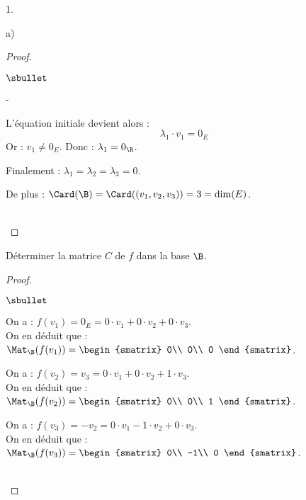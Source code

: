 \documentclass[11pt]{article}%
\begin{document}
\begin{noliste}{1.}
\begin{noliste}{a)}
\begin{proof}
\begin{noliste}{$\sbullet$}
\begin{noliste}{-}
      \item L'équation initiale devient alors :
	\[
        \lambda_1 \cdot v_1 = 0_E
	\]
	Or : $v_1 \neq 0_E$. Donc : $\lambda_1 = 0_{\R}$.
      \end{noliste}
      Finalement : $\lambda_1 = \lambda_2 = \lambda_3 = 0$. %
      
    \item De plus : $\Card(\B)=\Card((v_1,v_2,v_3))=3=\dim(E)$.
    \end{noliste}
    ~\\[-1cm]
  \end{proof}
  
  \item Déterminer la matrice $C$ de $f$ dans la base $\B$.
  
  \begin{proof}~
   \begin{noliste}{$\sbullet$}
    \item On a : $f(v_1) = 0_E = 0 \cdot v_1 + 0 \cdot v_2 + 0 \cdot 
    v_3$.\\[.2cm]
    On en déduit que : $\Mat_{\B}(f(v_1))=
    \begin{smatrix}
     0\\
     0\\
     0
    \end{smatrix}$.
    
    \item On a : $f(v_2) = v_3 = 0 \cdot v_1 + 0 \cdot v_2 + 1 \cdot 
    v_3$.\\[.2cm]
    On en déduit que : $\Mat_{\B}(f(v_2))=
    \begin{smatrix}
     0\\
     0\\
     1
    \end{smatrix}$.
    
    \item On a : $f(v_3) = -v_2 = 0 \cdot v_1 - 1 \cdot v_2 + 0 \cdot 
    v_3$.\\[.2cm]
    On en déduit que : $\Mat_{\B}(f(v_3))=
    \begin{smatrix}
     0\\
     -1\\
     0
    \end{smatrix}$.
   \end{noliste}
   ~\\[-1cm]
  \end{proof}


\end{noliste}
\end{noliste}
\end{document}
